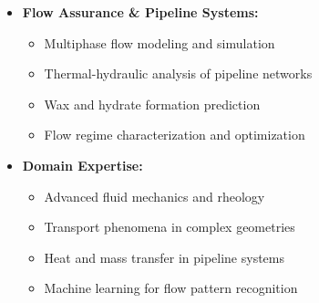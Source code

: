 \documentclass[a4paper,10pt]{article}
\begin{document}
\begin{itemize}[leftmargin=0.5cm]
\begin{itemize}
        \end{itemize}
    \item \textbf{Flow Assurance \& Pipeline Systems:}
        \begin{itemize}
            \item Multiphase flow modeling and simulation
            \item Thermal-hydraulic analysis of pipeline networks
            \item Wax and hydrate formation prediction
            \item Flow regime characterization and optimization
        \end{itemize}
    \item \textbf{Domain Expertise:}
        \begin{itemize}
            \item Advanced fluid mechanics and rheology
            \item Transport phenomena in complex geometries
            \item Heat and mass transfer in pipeline systems
            \item Machine learning for flow pattern recognition
        \end{itemize}
\end{itemize}


\vspace{3mm}
\end{document}
